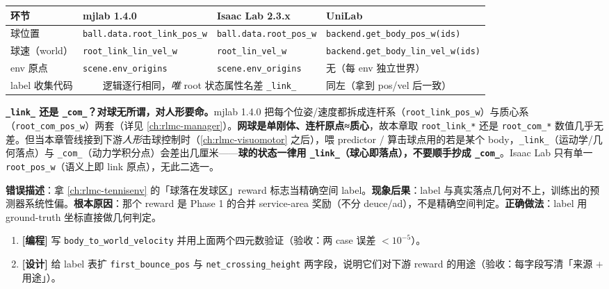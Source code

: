 \begin{center}
\small
\begin{tabular}{@{}llll@{}}
\toprule
环节 & mjlab 1.4.0 & Isaac Lab 2.3.x & UniLab \\
\midrule
球位置 & \verb|ball.data.root_link_pos_w| & \verb|ball.data.root_pos_w| & \verb|backend.get_body_pos_w(ids)| \\
球速（world） & \verb|root_link_lin_vel_w| & \verb|root_lin_vel_w| & \verb|backend.get_body_lin_vel_w(ids)| \\
env 原点 & \verb|scene.env_origins| & \verb|scene.env_origins| & 无（每 env 独立世界） \\
label 收集代码 & \multicolumn{2}{c}{逻辑逐行相同，\emph{唯} root 状态属性名差 \texttt{\_link\_}} & 同左（拿到 pos/vel 后一致） \\
\bottomrule
\end{tabular}
\end{center}

\begin{finenote}
\textbf{\texttt{\_link\_} 还是 \texttt{\_com\_}？对球无所谓，对人形要命。}mjlab 1.4.0 把每个位姿/速度都拆成连杆系（\texttt{root\_link\_pos\_w}）与质心系（\texttt{root\_com\_pos\_w}）两套（详见 \cref{ch:rlmc-manager}）。\textbf{网球是单刚体、连杆原点≈质心}，故本章取 \texttt{root\_link\_*} 还是 \texttt{root\_com\_*} 数值几乎无差。但当本章管线接到下游\emph{人形}击球控制时（\cref{ch:rlmc-visuomotor} 之后），喂 predictor / 算击球点用的若是某个 body，\texttt{\_link\_}（运动学/几何落点）与 \texttt{\_com\_}（动力学积分点）会差出几厘米——\textbf{球的状态一律用 \texttt{\_link\_}（球心即落点），不要顺手抄成 \texttt{\_com\_}}。Isaac Lab 只有单一 \texttt{root\_pos\_w}（语义上即 link 原点），无此二选一。
\end{finenote}

\begin{pitfall}
\textbf{错误描述}：拿 \cref{ch:rlmc-tennisenv} 的「球落在发球区」reward 标志当精确空间 label。\textbf{现象后果}：label 与真实落点几何对不上，训练出的预测器系统性偏。\textbf{根本原因}：那个 reward 是 Phase 1 的合并 service-area 奖励（不分 deuce/ad），不是精确空间判定。\textbf{正确做法}：label 用 ground-truth 坐标直接做几何判定。
\end{pitfall}

\begin{practice}[本节动手任务]
\begin{enumerate}
  \item \textbf{[编程]} 写 \verb|body_to_world_velocity| 并用上面两个四元数验证（验收：两 case 误差 $<10^{-5}$）。
  \item \textbf{[设计]} 给 label 表扩 \verb|first_bounce_pos| 与 \verb|net_crossing_height| 两字段，说明它们对下游 reward 的用途（验收：每字段写清「来源 $+$ 用途」）。
\end{enumerate}
\end{practice}

